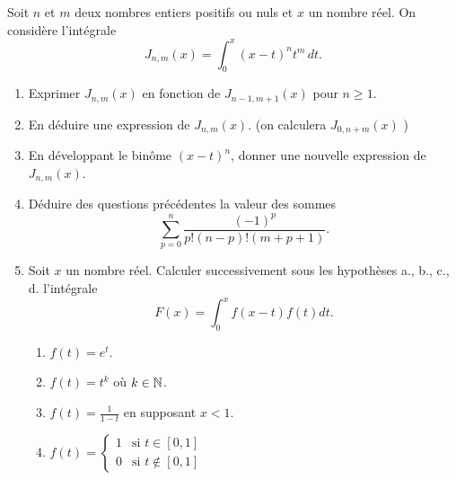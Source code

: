 Soit $n$ et $m$ deux nombres entiers positifs ou nuls et $x$ un nombre r{\'e}el. On consid{\`e}re l'int{\'e}grale
\[
J_{n,m}(x)=\int_{0}^{x}(x-t)^{n}t^{m}\,dt .
\]

\begin{enumerate}
\item  Exprimer $J_{n,m}(x)$ en fonction de $J_{n-1,m+1}(x)$ pour $n\geq 1$.

\item  En d{\'e}duire une expression de $J_{n,m}(x).$ (on calculera $J_{0,n+m}(x)$ )

\item  En d{\'e}veloppant le bin{\^o}me $(x-t)^{n}$, donner une nouvelle expression de $J_{n,m}(x)$.

\item  D{\'e}duire des questions pr{\'e}c{\'e}dentes la valeur des sommes
\[
\sum_{p=0}^{n}\frac{(-1)^{p}}{p!(n-p)!(m+p+1)}\text{.}
\]

\item  Soit $x$ un nombre r{\'e}el. Calculer successivement sous les hypoth{\`e}ses a., b., c., d. l'int{\'e}grale
\[
F(x)=\int_{0}^{x}f(x-t)f(t)dt.
\]

\begin{enumerate}
\item  $f(t)=e^{t}$.

\item  $f(t)=t^{k}$ o{\`u} $k\in \mathbb{N}$.

\item  $f(t)=\frac{1}{1-t}$ en supposant $ x < 1$.

\item  $f(t)=\left\{
\begin{array}{ll}
1 & \text{si }t\in \left[ 0,1\right]  \\
0 & \text{si }t\notin \left[ 0,1\right]
\end{array}
\right. $
\end{enumerate}
\end{enumerate}
